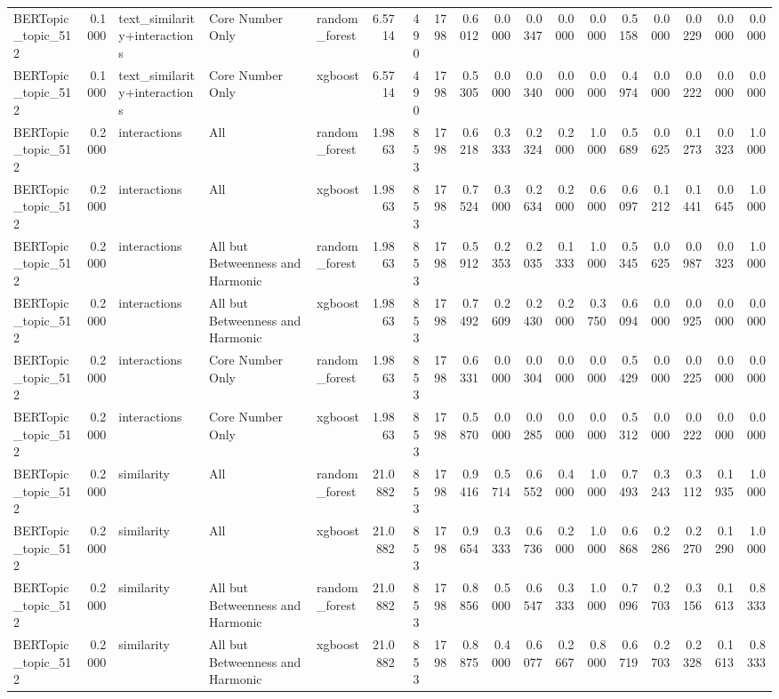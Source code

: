 \begin{tabular}{lrlllrrrrrrrrrrrrr}
BERTopic_topic_512 & 0.1000 & text_similarity+interactions & Core Number Only & random_forest & 6.5714 & 490 & 1798 & 0.6012 & 0.0000 & 0.0347 & 0.0000 & 0.0000 & 0.5158 & 0.0000 & 0.0229 & 0.0000 & 0.0000 \\
BERTopic_topic_512 & 0.1000 & text_similarity+interactions & Core Number Only & xgboost & 6.5714 & 490 & 1798 & 0.5305 & 0.0000 & 0.0340 & 0.0000 & 0.0000 & 0.4974 & 0.0000 & 0.0222 & 0.0000 & 0.0000 \\
BERTopic_topic_512 & 0.2000 & interactions & All & random_forest & 1.9863 & 853 & 1798 & 0.6218 & 0.3333 & 0.2324 & 0.2000 & 1.0000 & 0.5689 & 0.0625 & 0.1273 & 0.0323 & 1.0000 \\
BERTopic_topic_512 & 0.2000 & interactions & All & xgboost & 1.9863 & 853 & 1798 & 0.7524 & 0.3000 & 0.2634 & 0.2000 & 0.6000 & 0.6097 & 0.1212 & 0.1441 & 0.0645 & 1.0000 \\
BERTopic_topic_512 & 0.2000 & interactions & All but Betweenness and Harmonic & random_forest & 1.9863 & 853 & 1798 & 0.5912 & 0.2353 & 0.2035 & 0.1333 & 1.0000 & 0.5345 & 0.0625 & 0.0987 & 0.0323 & 1.0000 \\
BERTopic_topic_512 & 0.2000 & interactions & All but Betweenness and Harmonic & xgboost & 1.9863 & 853 & 1798 & 0.7492 & 0.2609 & 0.2430 & 0.2000 & 0.3750 & 0.6094 & 0.0000 & 0.0925 & 0.0000 & 0.0000 \\
BERTopic_topic_512 & 0.2000 & interactions & Core Number Only & random_forest & 1.9863 & 853 & 1798 & 0.6331 & 0.0000 & 0.0304 & 0.0000 & 0.0000 & 0.5429 & 0.0000 & 0.0225 & 0.0000 & 0.0000 \\
BERTopic_topic_512 & 0.2000 & interactions & Core Number Only & xgboost & 1.9863 & 853 & 1798 & 0.5870 & 0.0000 & 0.0285 & 0.0000 & 0.0000 & 0.5312 & 0.0000 & 0.0222 & 0.0000 & 0.0000 \\
BERTopic_topic_512 & 0.2000 & similarity & All & random_forest & 21.0882 & 853 & 1798 & 0.9416 & 0.5714 & 0.6552 & 0.4000 & 1.0000 & 0.7493 & 0.3243 & 0.3112 & 0.1935 & 1.0000 \\
BERTopic_topic_512 & 0.2000 & similarity & All & xgboost & 21.0882 & 853 & 1798 & 0.9654 & 0.3333 & 0.6736 & 0.2000 & 1.0000 & 0.6868 & 0.2286 & 0.2270 & 0.1290 & 1.0000 \\
BERTopic_topic_512 & 0.2000 & similarity & All but Betweenness and Harmonic & random_forest & 21.0882 & 853 & 1798 & 0.8856 & 0.5000 & 0.6547 & 0.3333 & 1.0000 & 0.7096 & 0.2703 & 0.3156 & 0.1613 & 0.8333 \\
BERTopic_topic_512 & 0.2000 & similarity & All but Betweenness and Harmonic & xgboost & 21.0882 & 853 & 1798 & 0.8875 & 0.4000 & 0.6077 & 0.2667 & 0.8000 & 0.6719 & 0.2703 & 0.2328 & 0.1613 & 0.8333 \\

\end{tabular}
